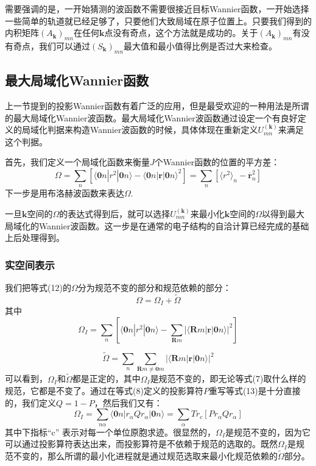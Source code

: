 需要强调的是，一开始猜测的波函数不需要很接近目标Wannier函数，一开始选择一些简单的轨道就已经足够了，只要他们大致局域在原子位置上。只要我们得到的内积矩阵$(A_{\bm{k}})_{mn}$在任何$\bm{k}$点没有奇点，这个方法就是成功的。关于$(A_{\bm{k}})_{mn}$有没有奇点，我们可以通过$(S_{\bm{k}})_{mn}$最大值和最小值得比例是否过大来检查。

\subsection{最大局域化Wannier函数}
上一节提到的投影Wannier函数有着广泛的应用，但是最受欢迎的一种用法是所谓的最大局域化Wannier波函数。最大局域化Wannier波函数通过设定一个有良好定义的局域化判据来构造Wannier波函数的时候，具体体现在重新定义$U^{(\bm{k})}_{mn}$来满足这个判据。

首先，我们定义一个局域化函数来衡量$J$个Wannier函数的位置的平方差：
\begin{equation}
\Omega=\sum_n [\langle\bm{0} n | r^2 | \bm{0}n \rangle -\langle \bm{0}n|\bm{r}|\bm{0}n\rangle^2]=\sum_n[\langle r^2\rangle_n-\bm{\overline r}^2_n]
\end{equation}
下一步是用布洛赫波函数来表达$\Omega$.

一旦$\bm{k}$空间的$\Omega$的表达式得到后，就可以选择$U^{(\bm{k})}_{mn}$来最小化$\bm{k}$空间的$\Omega$以得到最大局域化的Wannier波函数。这一步是在通常的电子结构的自洽计算已经完成的基础上后处理得到。


\subsubsection{实空间表示}
我们把等式(12)的$\Omega$分为规范不变的部分和规范依赖的部分：
\begin{equation}
\Omega=\Omega_I+\widetilde\Omega
\end{equation}
其中
\begin{equation}
\Omega_I=\sum_n [\langle\bm{0} n | r^2 | \bm{0}n \rangle -\sum_{\bm{R}m}|\langle \bm{R}m|\bm{r}|\bm{0}n\rangle|^2] 
\end{equation}

\begin{equation}
\widetilde \Omega=\sum_n \sum_{\bm{R}m\neq \bm{0}m}|\langle \bm{R}m|\bm{r}|\bm{0}n\rangle|^2
\end{equation}
可以看到，$\Omega_I$和$ \widetilde \Omega$都是正定的，其中$\Omega_I$是规范不变的，即无论等式(7)取什么样的规范，它都是不变了。通过在等式(8)定义的投影算符$P$重写等式(13)是十分直接的，我们定义$Q=1-P$，然后我们又有：
\begin{equation}
\Omega_I=\sum_{n\alpha} \langle\bm{0} n | r_\alpha Q  r_\alpha  | \bm{0}n \rangle=\sum_\alpha Tr_c[P r_\alpha Q r_\alpha]
\end{equation}
其中下指标“c” 表示对每一个单位原胞求迹。很显然的，$\Omega_I$是规范不变的，因为它可以通过投影算符表达出来，而投影算符是不依赖于规范的选取的。既然$\Omega_I$是规范不变的，那么所谓的最小化进程就是通过规范选取来最小化规范依赖的$ \widetilde \Omega$部分。

